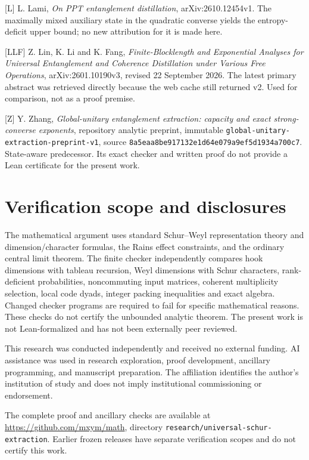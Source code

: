 \documentclass[11pt]{article}
\begin{document}
{[}L{]} L. Lami, \emph{On PPT entanglement distillation}, arXiv:2610.12454v1. The maximally mixed auxiliary state in the quadratic converse yields the entropy-deficit upper bound; no new attribution for it is made here.

{[}LLF{]} Z. Lin, K. Li and K. Fang, \emph{Finite-Blocklength and Exponential Analyses for Universal Entanglement and Coherence Distillation under Various Free Operations}, arXiv:2601.10190v3, revised 22 September 2026. The latest primary abstract was retrieved directly because the web cache still returned v2. Used for comparison, not as a proof premise.

{[}Z{]} Y. Zhang, \emph{Global-unitary entanglement extraction: capacity and exact strong-converse exponents}, repository analytic preprint, immutable \texttt{global-unitary-extraction-preprint-v1}, source \texttt{8a5eaa8be917132e1d64e079a9ef5d1934a700c7}. State-aware predecessor. Its exact checker and written proof do not provide a Lean certificate for the present work.


\section*{Verification scope and disclosures}
The mathematical argument uses standard Schur--Weyl representation theory and dimension/character formulas, the Rains effect constraints, and the ordinary central limit theorem. The finite checker independently compares hook dimensions with tableau recursion, Weyl dimensions with Schur characters, rank-deficient probabilities, noncommuting input matrices, coherent multiplicity selection, local code dyads, integer packing inequalities and exact algebra. Changed checker programs are required to fail for specific mathematical reasons. These checks do not certify the unbounded analytic theorem. The present work is not Lean-formalized and has not been externally peer reviewed.

This research was conducted independently and received no external funding. AI assistance was used in research exploration, proof development, ancillary programming, and manuscript preparation. The affiliation identifies the author's institution of study and does not imply institutional commissioning or endorsement.

The complete proof and ancillary checks are available at \url{https://github.com/mxym/math}, directory \texttt{research/universal-schur-extraction}. Earlier frozen releases have separate verification scopes and do not certify this work.
\end{document}

